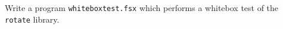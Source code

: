 Write a program \lstinline{whiteboxtest.fsx} which performs a whitebox test of the \lstinline{rotate} library.
